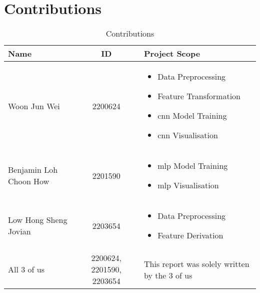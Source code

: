 \section{Contributions}\label{contribution}

\begin{table}[htbp]
  \caption{Contributions}\label{tab:contributions}
  \centering
  \begin{tabular}{p{5cm}|c|p{7cm}}
    \hline
    \textbf{Name} & \textbf{ID} & \textbf{Project Scope} \\
    \hline
        Woon Jun Wei & 2200624 &
        \begin{itemize}
            \item Data Preprocessing
            \item Feature Transformation
            \item \gls{cnn} Model Training
            \item \gls{cnn} Visualisation
        \end{itemize}\\
        \hline
        Benjamin Loh Choon How & 2201590 &
        \begin{itemize}
            \item \gls{mlp} Model Training
            \item \gls{mlp} Visualisation
        \end{itemize}\\
        \hline
        Low Hong Sheng Jovian & 2203654 &
        \begin{itemize}
            \item Data Preprocessing
            \item Feature Derivation
        \end{itemize}\\
        \hline
        All 3 of us & 2200624, 2201590, 2203654 & This report was solely written by the 3 of us\\
        \hline
    \hline
  \end{tabular}
\end{table}
